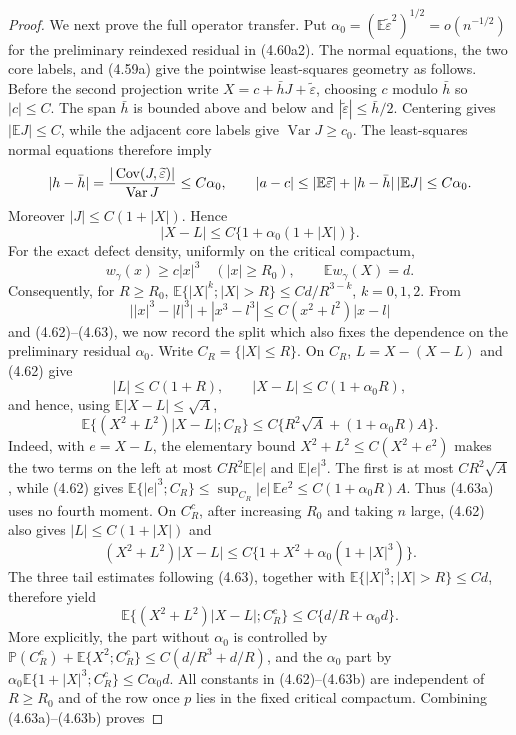 \documentclass[11pt,a4paper]{article}
\numberwithin{equation}{section}
\theoremstyle{definition}
\theoremstyle{remark}
\newcommand{\E}{\mathbb E}
\newcommand{\Pp}{\mathbb P}
\begin{document}
\begin{proof}
We next prove the full operator transfer.  Put
$\alpha_0=(\E\widetilde\varepsilon^2)^{1/2}=o(n^{-1/2})$ for the
preliminary reindexed residual in (4.60a2).  The normal equations, the two
core labels, and (4.59a) give the pointwise least-squares geometry as
follows.  Before the second projection write
$X=c+\bar hJ+\widetilde\varepsilon$, choosing $c$ modulo $\bar h$ so
$|c|\le C$.  The span $\bar h$ is bounded above and below and
$|\widetilde\varepsilon|\le\bar h/2$.  Centering gives $|\E J|\le C$,
while the adjacent core labels give $\operatorname {Var}J\ge c_0$.  The least-squares
normal equations therefore imply
\[
 |h-\bar h|={|\operatorname {Cov}(J,\widetilde\varepsilon)|
              \over\operatorname {Var}J}
 \le C\alpha_0,\qquad
 |a-c|\le|\E\widetilde\varepsilon|
       +|h-\bar h|\,|\E J|\le C\alpha_0.
\]
Moreover $|J|\le C(1+|X|)$.  Hence
\[
 |X-L|\le C\{1+\alpha_0(1+|X|)\}.                    \tag{4.62}
\]
For the exact defect density, uniformly on the critical compactum,
\[
 w_\gamma(x)\ge c|x|^3\quad(|x|\ge R_0),\qquad
 \E w_\gamma(X)=d.                                    \tag{4.63}
\]
Consequently, for $R\ge R_0$,
$\E\{|X|^k;|X|>R\}\le Cd/R^{3-k}$, $k=0,1,2$.  From
\[
 \big||x|^3-|l|^3\big|+|x^3-l^3|
 \le C(x^2+l^2)|x-l|
\]
and (4.62)--(4.63), we now record the split which also fixes the
dependence on the preliminary residual $\alpha _0$.  Write
$C_R=\{|X|\le R\}$.  On $C_R$, $L=X-(X-L)$ and (4.62) give
\[
 |L|\le C(1+R),\qquad |X-L|\le C(1+\alpha _0R),
\]
and hence, using $\E|X-L|\le\sqrt A$,
\[
 \E\{(X^2+L^2)|X-L|;C_R\}
 \le C\{R^2\sqrt A+(1+\alpha _0R)A\}.                \tag{4.63a}
\]
Indeed, with $e=X-L$, the elementary bound
$X^2+L^2\le C(X^2+e^2)$ makes the two terms on the left at most
$CR^2\E|e|$ and $\E|e|^3$.  The first is at most $CR^2\sqrt A$, while
(4.62) gives
$\E\{|e|^3;C_R\}\le\sup_{C_R}|e|\,\E e^2
\le C(1+\alpha _0R)A$.  Thus (4.63a) uses no fourth moment.
On $C_R^c$, after increasing $R_0$ and taking $n$ large, (4.62) also gives
$|L|\le C(1+|X|)$ and
\[
 (X^2+L^2)|X-L|
 \le C\{1+X^2+\alpha _0(1+|X|^3)\}.
\]
The three tail estimates following (4.63), together with
$\E\{|X|^3;|X|>R\}\le Cd$, therefore yield
\[
 \E\{(X^2+L^2)|X-L|;C_R^c\}
      \le C\{d/R+\alpha _0d\}.                       \tag{4.63b}
\]
More explicitly, the part without $\alpha _0$ is controlled by
$\Pp(C_R^c)+\E\{X^2;C_R^c\}\le C(d/R^3+d/R)$, and the
$\alpha _0$ part by
$\alpha _0\E\{1+|X|^3;C_R^c\}\le C\alpha _0d$.
All constants in (4.62)--(4.63b) are independent of $R\ge R_0$ and of
the row once $p$ lies in the fixed critical compactum.
Combining (4.63a)--(4.63b) proves

\end{proof}
\end{document}
